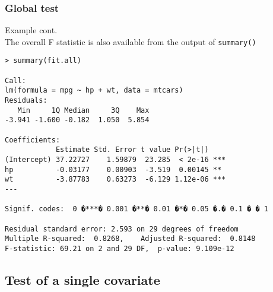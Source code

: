 \documentclass[compress]{beamer}
\begin{document}
  
\begin{frame}[fragile]\frametitle{Global test}
Example cont.\\[0.5cm]

The overall F statistic is also available from the output of \verb'summary()' 
\tiny\begin{verbatim}
> summary(fit.all)

Call:
lm(formula = mpg ~ hp + wt, data = mtcars)
Residuals:
   Min     1Q Median     3Q    Max 
-3.941 -1.600 -0.182  1.050  5.854 

Coefficients:
            Estimate Std. Error t value Pr(>|t|)    
(Intercept) 37.22727    1.59879  23.285  < 2e-16 ***
hp          -0.03177    0.00903  -3.519  0.00145 ** 
wt          -3.87783    0.63273  -6.129 1.12e-06 ***
---

Signif. codes:  0 �***� 0.001 �**� 0.01 �*� 0.05 �.� 0.1 � � 1

Residual standard error: 2.593 on 29 degrees of freedom
Multiple R-squared:  0.8268,	Adjusted R-squared:  0.8148 
F-statistic: 69.21 on 2 and 29 DF,  p-value: 9.109e-12
\end{verbatim}
\end{frame}  
  
\subsection{Test of a single covariate} %
\end{document}
